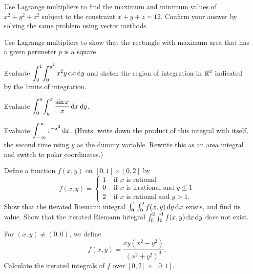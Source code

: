 \documentclass[prettycode,shellescape]{watsonbook}
\begin{document}
\begin{aexercise}
  Use Lagrange multipliers to find the maximum and minimum values of
  $x^2 + y^2 + z^2$ subject to the constraint $x + y + z =
  12$. Confirm your answer by solving the same problem using vector
  methods.
\end{aexercise}

\begin{aexercise}
  Use Lagrange multipliers to show that the rectangle with maximum
  area that has a given perimeter $p$ is a square.
\end{aexercise}


\begin{aexercise}
  Evaluate
  $\displaystyle{\int_{0}^{1}\!\int_{0}^{y^2} x^2 y \,\mathrm{d}x\,\mathrm{d}y}$ and
  sketch the region of integration in $\mathbb{R}^2$ indicated by the limits
  of integration.
\end{aexercise}

\begin{aexercise}
  Evaluate $\displaystyle{\int_{0}^\pi \!\int_{y}^{\pi}\frac{\sin x}{x} \,\mathrm{d}x\,\mathrm{d}y}$.
\end{aexercise}

\begin{aexercise}%
  Evaluate $\displaystyle{\int_{-\infty}^{\infty} \mathrm{e}^{-x^2}\,\mathrm{d}x}$. (Hints: write down
  the product of this integral with itself, the second time using $y$
  as the dummy variable. Rewrite this as an area integral and switch
  to polar coordinates.)
\end{aexercise}

\begin{aexercise}%
  Define a function $f(x,y)$ on $[0,1] \times [0,2]$ by
  \[
    f(x,y) = \left\{
      \begin{array}{cl}
        1 & \text{ if }x\text{ is rational} \\
        0 & \text{ if }x\text{ is irrational and }y \leq 1 \\
        2 & \text{ if }x\text{ is rational and }y > 1.
      \end{array} 
    \right.
  \]
  Show that the iterated Riemann integral
  $\int_0^1\int_0^2 f(x,y)\,\mathrm{d} y\,\mathrm{d} x$ exists, and find
  its value. Show that the iterated Riemann integral
  $\int_0^2\int_0^1 f(x,y)\,\mathrm{d} x\,\mathrm{d} y$ does not exist.
\end{aexercise}

\begin{aexercise}
  For $(x,y) \neq (0,0)$, we define
  \[
    f(x,y) = \frac{xy(x^2-y^2)}{(x^2+y^2)^3}.
  \]
  Calculate the iterated integrals of $f$ over $[0,2]\times[0,1]$.
\end{aexercise}
\end{document}
